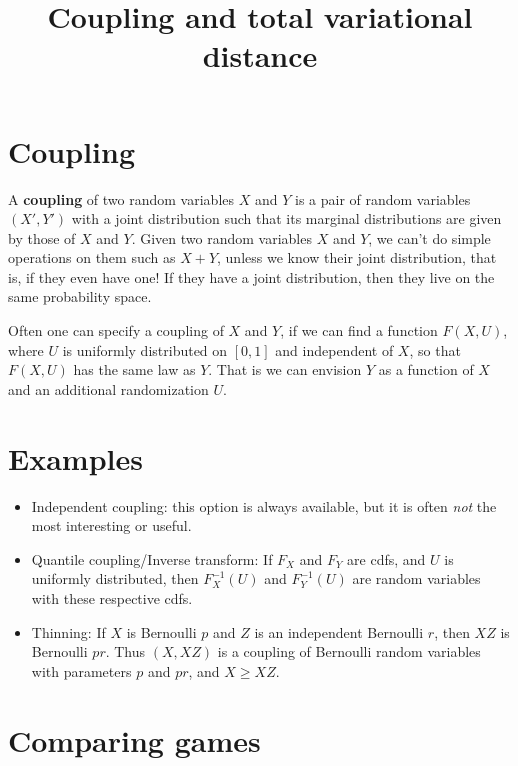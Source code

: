 \documentclass[
]{article}
\title{Coupling and total variational distance}
\author{}
\date{\vspace{-2.5em}}
\theoremstyle{definition}
\theoremstyle{definition}
\theoremstyle{definition}
\theoremstyle{definition}
\theoremstyle{remark}
\begin{document}
\maketitle

{
\setcounter{tocdepth}{2}
\tableofcontents
}
\hypertarget{coupling}{%
\section{Coupling}\label{coupling}}

A \textbf{coupling} of two random variables \(X\) and \(Y\) is a pair of random variables \((X', Y')\) with a joint distribution such that its marginal distributions are given by those of \(X\) and \(Y\). Given two random variables \(X\) and \(Y\), we can't do simple operations on them such as \(X+Y\), unless we know their joint distribution, that is, if they even have one! If they have a joint distribution, then they live on the same probability space.

Often one can specify a coupling of \(X\) and \(Y\), if we can find a function \(F(X, U)\), where \(U\) is uniformly distributed on \([0,1]\) and independent of \(X\), so that \(F(X, U)\) has the same law as \(Y\). That is we can envision \(Y\) as a function of \(X\) and an additional randomization \(U\).

\hypertarget{examples}{%
\section{Examples}\label{examples}}

\begin{itemize}
\item
  Independent coupling: this option is always available, but it is often \emph{not} the most interesting or useful.
\item
  Quantile coupling/Inverse transform: If \(F_X\) and \(F_Y\) are cdfs, and \(U\) is uniformly distributed, then \(F_X^{-1}(U)\) and \(F_Y^{-1}(U)\) are random variables with these respective cdfs.
\item
  Thinning: If \(X\) is Bernoulli \(p\) and \(Z\) is an independent Bernoulli \(r\), then \(XZ\) is Bernoulli \(pr\). Thus \((X, XZ)\) is a coupling of Bernoulli random variables with parameters \(p\) and \(pr\), and \(X \geq XZ\).
\end{itemize}

\hypertarget{comparing-games}{%
\section{Comparing games}\label{comparing-games}}
\end{document}
